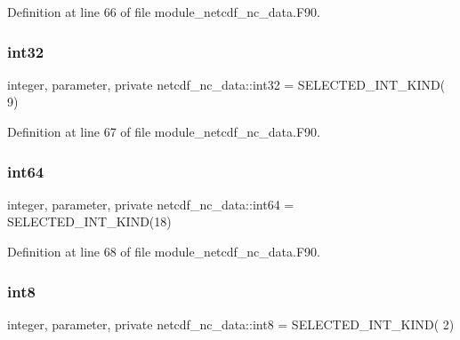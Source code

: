 Definition at line 66 of file module\+\_\+netcdf\+\_\+nc\+\_\+data.\+F90.

\mbox{\label{namespacenetcdf__nc__data_a46f18116f7eef966c6ca8e2a32146c1f}} 
\subsubsection{\texorpdfstring{int32}{int32}}
{\footnotesize\ttfamily integer, parameter, private netcdf\+\_\+nc\+\_\+data\+::int32 = S\+E\+L\+E\+C\+T\+E\+D\+\_\+\+I\+N\+T\+\_\+\+K\+I\+ND( 9)\hspace{0.3cm}{\ttfamily [private]}}



Definition at line 67 of file module\+\_\+netcdf\+\_\+nc\+\_\+data.\+F90.

\mbox{\label{namespacenetcdf__nc__data_a1fdc3bacc11102e964238610883f87aa}} 
\subsubsection{\texorpdfstring{int64}{int64}}
{\footnotesize\ttfamily integer, parameter, private netcdf\+\_\+nc\+\_\+data\+::int64 = S\+E\+L\+E\+C\+T\+E\+D\+\_\+\+I\+N\+T\+\_\+\+K\+I\+ND(18)\hspace{0.3cm}{\ttfamily [private]}}



Definition at line 68 of file module\+\_\+netcdf\+\_\+nc\+\_\+data.\+F90.

\mbox{\label{namespacenetcdf__nc__data_a7a38aef8544775b499eab82d49160d8f}} 
\subsubsection{\texorpdfstring{int8}{int8}}
{\footnotesize\ttfamily integer, parameter, private netcdf\+\_\+nc\+\_\+data\+::int8 = S\+E\+L\+E\+C\+T\+E\+D\+\_\+\+I\+N\+T\+\_\+\+K\+I\+ND( 2)\hspace{0.3cm}{\ttfamily [private]}}



